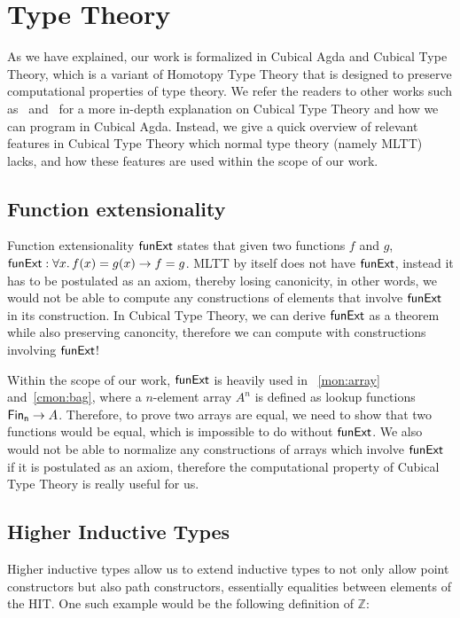 \section{Type Theory}
\label{sec:type-theory}
As we have explained, our work is formalized in Cubical Agda and Cubical Type Theory,
which is a variant of Homotopy Type Theory that is designed to preserve
computational properties of type theory.
We refer the readers to other works such as~\cite{vezzosiCubicalAgdaDependently2019}
and~\cite{cohenCubicalTypeTheory2018} for a more in-depth explanation on Cubical Type Theory
and how we can program in Cubical Agda. Instead, we give a quick overview of relevant features
in Cubical Type Theory which normal type theory (namely MLTT) lacks, and how these features
are used within the scope of our work.

\subsection{Function extensionality}
Function extensionality $\operatorname{\mathsf{funExt}}$ states that given two functions $f$ and $g$,
$\operatorname{\mathsf{funExt}}: \forall x.\,f(x) = g(x) \to f = g$. MLTT by itself does not have $\operatorname{\mathsf{funExt}}$,
instead it has to be postulated as an axiom, thereby losing canonicity, in other words,
we would not be able to compute any constructions of elements that involve $\operatorname{\mathsf{funExt}}$
in its construction. In Cubical Type Theory, we can derive $\operatorname{\mathsf{funExt}}$
as a theorem while also preserving canoncity, therefore we can compute with constructions
involving $\operatorname{\mathsf{funExt}}$!

Within the scope of our work, $\operatorname{\mathsf{funExt}}$ is heavily used in
~\cref{mon:array} and~\cref{cmon:bag}, where a $n$-element array $A^n$ is defined as lookup functions
$\Fin[n] \to A$. Therefore, to prove two arrays are equal, we need to show that two functions would be
equal, which is impossible to do without $\operatorname{\mathsf{funExt}}$. We also would not be able to normalize
any constructions of arrays which involve $\operatorname{\mathsf{funExt}}$ if it is postulated as an axiom, therefore
the computational property of Cubical Type Theory is really useful for us.

\subsection{Higher Inductive Types}
Higher inductive types allow us to extend inductive types to not only allow point constructors
but also path constructors, essentially equalities between elements of the HIT. One such example
would be the following definition of $\mathbb{Z}$:


